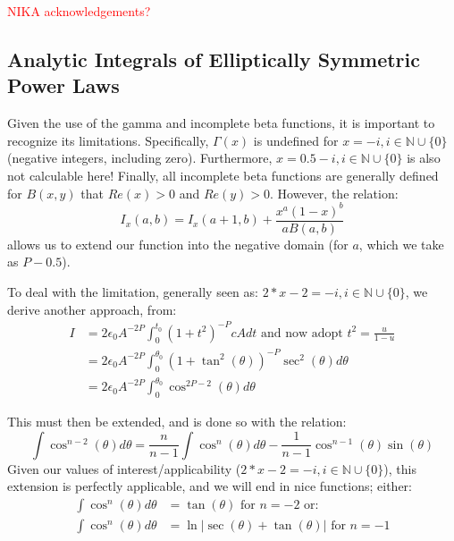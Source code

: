 \documentclass[iop,numberedappendix,apj]{emulateapj}
\begin{document}
\textcolor{red}{NIKA acknowledgements?}



\appendix

\subsection{{\color{red}Analytic Integrals of Elliptically Symmetric Power Laws}}
\label{sec:analytic_integrals}

Given the use of the gamma and incomplete beta functions, it is important to recognize its limitations.
Specifically, $\Gamma(x)$ is undefined for $x = -i, i \in \mathbb{N} \cup \{0\}$ (negative integers, including
zero). Furthermore, $x = 0.5-i, i \in \mathbb{N} \cup \{0\}$ is also not calculable here! Finally, all incomplete
beta functions are generally defined for $B(x,y)$ that $Re(x) > 0$ and $Re(y) > 0$. However, the relation:
\begin{equation}
  I_x(a,b) = I_x(a+1,b) + \frac{x^a (1-x)^b}{a B(a,b)}
  \label{eqn:recibeta}
\end{equation}
allows us to extend our function into the negative domain (for $a$, which we take as $P-0.5$). 

To deal with the limitation, generally seen as: $2*x-2 = -i, i \in \mathbb{N} \cup \{0\}$, we derive another approach, from:
\begin{align}
  I &= 2 \epsilon_0 A^{-2P} \int_{0}^{t_0}(1+t^2)^{-P} c A dt \text{ and now adopt } t^2 = \frac{u}{1-u} \\
    &= 2 \epsilon_0 A^{-2P} \int_{0}^{\theta_0}(1+\tan^2(\theta))^{-P} \sec^2(\theta) d\theta \\
    &= 2 \epsilon_0 A^{-2P} \int_{0}^{\theta_0}\cos^{2P-2}(\theta) d\theta
\end{align}

This must then be extended, and is done so with the relation:
\begin{equation}
  \int \cos^{n-2}(\theta) d\theta = \frac{n}{n-1}\int \cos^n(\theta)d\theta - \frac{1}{n-1}\cos^{n-1}(\theta)\sin(\theta) 
  \label{eqn:cosext}
\end{equation}
Given our values of interest/applicability ($2*x-2 = -i, i \in \mathbb{N} \cup \{0\}$), this extension is perfectly
applicable, and we will end in nice functions; either:
\begin{align*}
  \int \cos^n(\theta)d\theta &= \tan(\theta) \text{ for } n=-2 \text{ or: } \\
  \int \cos^n(\theta)d\theta &= \ln \vert \sec(\theta) + \tan(\theta) \vert \text{ for } n=-1
\end{align*}
\end{document}
